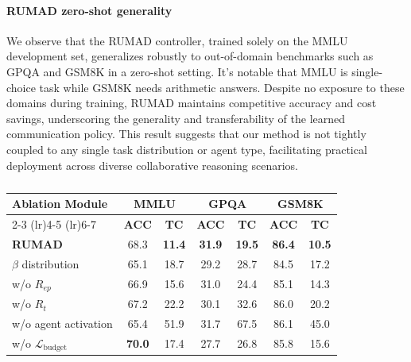 
\paragraph{\textbf{RUMAD zero-shot generality}} We observe that the RUMAD controller, trained solely on the MMLU development set, generalizes robustly to out-of-domain benchmarks such as GPQA and GSM8K in a zero-shot setting. It's notable that MMLU is single-choice task while GSM8K needs arithmetic answers. Despite no exposure to these domains during training, RUMAD maintains competitive accuracy and cost savings, underscoring the generality and transferability of the learned communication policy.  This result suggests that our method is not tightly coupled to any single task distribution or agent type, facilitating practical deployment across diverse collaborative reasoning scenarios.

\begin{table}[t]
\setlength{\tabcolsep}{1.3mm}
\centering
\caption{}
\begin{tabular}{lcccccc}
\toprule
\multirow{2.5}{*}{\textbf{Ablation Module}} & \multicolumn{2}{c}{\textbf{MMLU}} & \multicolumn{2}{c}{\textbf{GPQA}} & \multicolumn{2}{c}{\textbf{GSM8K}} \\
\cmidrule(lr){2-3} \cmidrule(lr){4-5} \cmidrule(lr){6-7}
 & \textbf{ACC} & \textbf{TC} & \textbf{ACC} & \textbf{TC} & \textbf{ACC} & \textbf{TC} \\
\midrule
\textbf{RUMAD} & 68.3 & \textbf{11.4} & \textbf{31.9} & \textbf{19.5} & \textbf{86.4} & \textbf{10.5} \\
$\beta$ distribution & 65.1 & 18.7 & 29.2 & 28.7 & 84.5 & 17.2 \\
w/o $R_{ep}$ & 66.9 & 15.6 & 31.0 & 24.4 & 85.1 & 14.3 \\
w/o $R_{t}$ & 67.2 & 22.2 & 30.1 & 32.6 & 86.0 & 20.2 \\
w/o agent activation & 65.4 & 51.9 & 31.7 & 67.5 & 86.1 & 45.0 \\
w/o $\mathcal{L}_\mathrm{budget}$ & \textbf{70.0} & 17.4 & 27.7 & 26.8 & 85.8 & 15.6 \\
\bottomrule
\end{tabular}
\label{tab:ablation}
\end{table}

